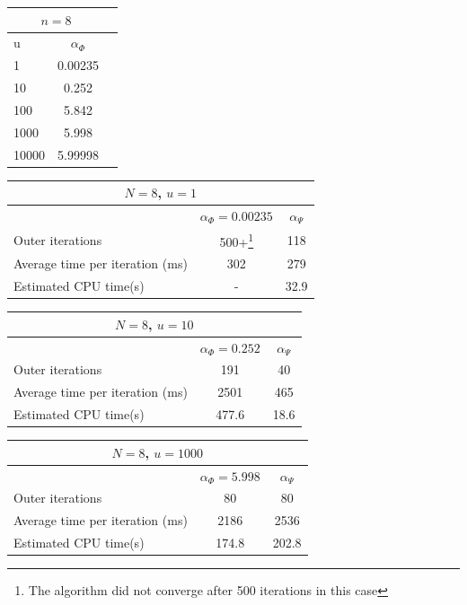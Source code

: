 \documentclass{article}
\begin{document}
\begin{center}
    \begin{tabular}{|l | c | c|}
        \hline
        \multicolumn{2}{|c|}{$n=8$}\\
        \hline
        u & $\alpha_{\Phi}$ \\
        \hline
        1 & 0.00235 \\
        10 & 0.252 \\
        100 & 5.842 \\
        1000 & 5.998 \\
        10000 & 5.99998 \\
        \hline
    \end{tabular}
\end{center}

\begin{center}
\begin{tabular}{|l | c | c|}
    \hline
    \multicolumn{3}{|c|}{$N = 8$, $u = 1$}\\
    \hline
     & $\alpha_{\Phi} = 0.00235$ & $ \alpha_{\Psi}$  \\
     \hline
    Outer iterations & 500+\footnote{The algorithm did not converge after 500 iterations in this case} & 118 \\
    Average time per iteration (ms) & 302 & 279 \\
    Estimated CPU time(s) & - & 32.9 \\
    \hline
\end{tabular}
\end{center}

\begin{center}
\begin{tabular}{|l | c | c|}
    \hline
    \multicolumn{3}{|c|}{$N = 8$, $u = 10$}\\
    \hline
     & $\alpha_{\Phi} = 0.252$ & $ \alpha_{\Psi}$  \\
     \hline
    Outer iterations & 191 & 40 \\
    Average time per iteration (ms) & 2501 & 465 \\
    Estimated CPU time(s) & 477.6 & 18.6 \\
    \hline
\end{tabular}
\end{center}

\begin{center}
\begin{tabular}{|l | c | c|}
    \hline
    \multicolumn{3}{|c|}{$N = 8$, $u = 1000$}\\
    \hline
     & $\alpha_{\Phi} = 5.998$ & $ \alpha_{\Psi}$  \\
     \hline
    Outer iterations & 80 & 80 \\
    Average time per iteration (ms) & 2186 & 2536 \\
    Estimated CPU time(s) & 174.8 & 202.8 \\
    \hline
\end{tabular}
\end{center}
\end{document}
